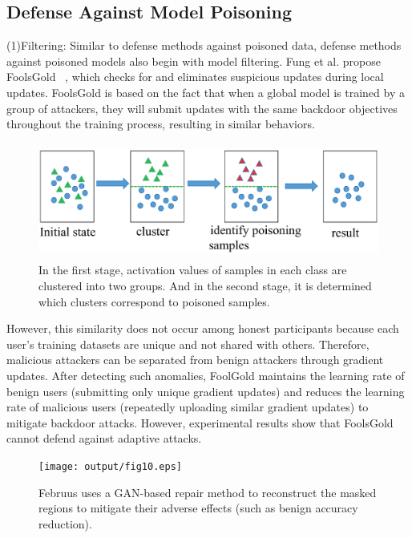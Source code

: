 \documentclass[pdflatex,sn-mathphys-num]{sn-jnl}%
\theoremstyle{thmstyleone}%
\theoremstyle{thmstyletwo}%
\theoremstyle{thmstylethree}%
\begin{document}
\subsection{Defense Against Model Poisoning}
(1)Filtering: Similar to defense methods against
poisoned data, defense methods against poisoned models also
begin with model filtering. Fung et al. propose FoolsGold~\cite{fung2018mitigating}
, which checks for and eliminates suspicious updates
during local updates. FoolsGold is based on the fact that
when a global model is trained by a group of attackers,
they will submit updates with the same backdoor objectives
throughout the training process, resulting in similar behaviors.

\begin{figure}[h]
	\centering
	\includegraphics[width=1.0\linewidth,height=1.5in]{output/fig9.eps}
	\caption{In the first stage, activation values of samples in each class are
		clustered into two groups. And in the second stage, it is determined
		which clusters correspond to poisoned samples.}
	\label{fig9}
\end{figure}

However, this similarity does not occur among honest
participants because each user’s training datasets are
unique and not shared with others. Therefore,
malicious attackers can be separated from benign attackers
through gradient updates. After detecting such anomalies,
FoolGold maintains the learning rate of benign users
(submitting only unique gradient updates) and reduces
the learning rate of malicious users (repeatedly uploading
similar gradient updates) to mitigate backdoor attacks.
However, experimental results show that FoolsGold cannot
defend against adaptive attacks.

\begin{figure}[h]
	\centering
	\texttt{[image: output/fig10.eps]}
	\caption{Februus uses a GAN-based repair method to reconstruct
		the masked regions to mitigate their adverse effects (such as benign
		accuracy reduction).}
	\label{fig10}
\end{figure}
\end{document}
